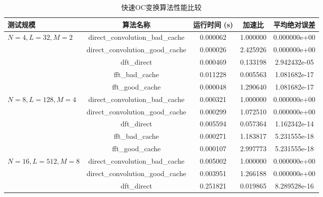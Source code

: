 \begin{table}[htbp]
    \centering
    \caption{快速OC变换算法性能比较}
    \label{tab:performance-comparison-new}
    \begin{tabular}{lcccc}

        \textbf{测试规模} & \textbf{算法名称}                    & \textbf{运行时间 (s)} & \textbf{加速比} & \textbf{平均绝对误差} \\
        \midrule
        \multirow{5}{*}{\(N=4, L=32, M=2\)}
                      & direct\_convolution\_bad\_cache  & 0.000062          & 1.000000     & 0.000000e+00    \\
                      & direct\_convolution\_good\_cache & 0.000026          & 2.425926     & 0.000000e+00    \\
                      & dft\_direct                      & 0.000469          & 0.133198     & 2.942432e-05    \\
                      & fft\_bad\_cache                  & 0.011228          & 0.005563     & 1.081682e-17    \\
                      & fft\_good\_cache                 & 0.000048          & 1.290640     & 1.081682e-17    \\
        \midrule
        \multirow{5}{*}{\(N=8, L=128, M=4\)}
                      & direct\_convolution\_bad\_cache  & 0.000321          & 1.000000     & 0.000000e+00    \\
                      & direct\_convolution\_good\_cache & 0.000299          & 1.072510     & 0.000000e+00    \\
                      & dft\_direct                      & 0.005594          & 0.057364     & 1.162342e-14    \\
                      & fft\_bad\_cache                  & 0.000271          & 1.183817     & 5.231555e-18    \\
                      & fft\_good\_cache                 & 0.000107          & 2.997773     & 5.231555e-18    \\
        \midrule
        \multirow{5}{*}{\(N=16, L=512, M=8\)}
                      & direct\_convolution\_bad\_cache  & 0.005002          & 1.000000     & 0.000000e+00    \\
                      & direct\_convolution\_good\_cache & 0.003951          & 1.266188     & 0.000000e+00    \\
                      & dft\_direct                      & 0.251821          & 0.019865     & 8.289528e-16    \\

\end{tabular}
\end{table}
